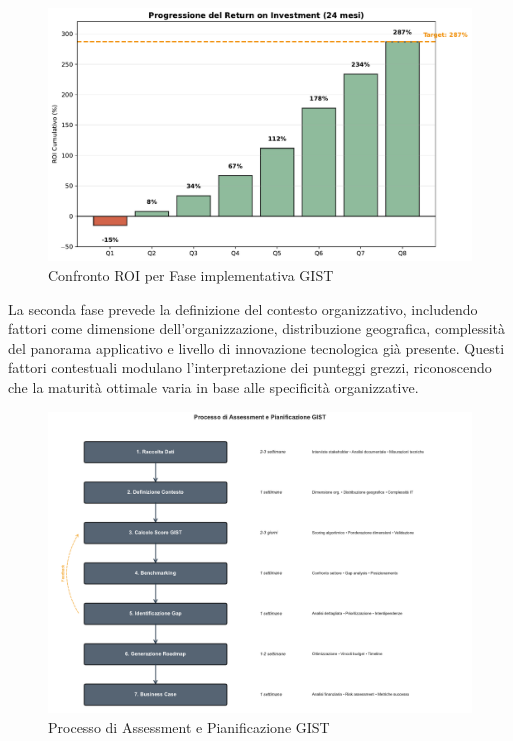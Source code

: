 \begin{figure}[htbp]
\centering
\includegraphics[width=1\textwidth]{thesis_figures/cap5/fig_5_2_roi_progression.pdf}

\caption{Confronto ROI per Fase implementativa GIST}
\label{fig:roi_gist}
\end{figure}


La seconda fase prevede la definizione del contesto organizzativo, includendo fattori come dimensione dell'organizzazione, distribuzione geografica, complessità del panorama applicativo e livello di innovazione tecnologica già presente. Questi fattori contestuali modulano l'interpretazione dei punteggi grezzi, riconoscendo che la maturità ottimale varia in base alle specificità organizzative.

\begin{figure}[htbp]
\centering
\includegraphics[width=1\textwidth]{thesis_figures/cap5/fig_5_2_process.pdf}
\caption{Processo di Assessment e Pianificazione GIST}
\label{fig:processo_gist}
\end{figure}

